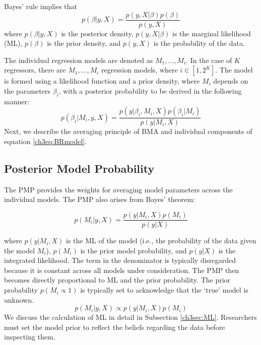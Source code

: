 \begin{refsection}
\begin{subappendices}
    Bayes' rule implies that
    \begin{equation}\label{ch3eq:BRmodel}
    p(\beta \vert y,X) = \frac{p(y,X\vert \beta)p(\beta)}{p(y,X)}
    \end{equation}
    where $p(\beta \vert y, X)$ is the posterior density, $p(y, X\vert \beta)$ is the marginal likelihood (ML), $p(\beta)$ is the prior density, and $p(y,X)$ is the probability of the data. 
    
    The individual regression models are denoted as $M_{1},...,M_{i}$. In the case of $K$ regressors, there are $M_{1},...,M_{i}$ regression models, where $i \in [1,2^{K}]$. The model is formed using a likelihood function and a prior density, where $M_{i}$ depends on the parameters $\beta_{i}$, with a posterior probability to be derived in the following manner:
    \begin{equation}\label{ch3eq:BROM}
    p(\beta_{i} \vert M_{i},y,X) = \frac{p(y\vert \beta_{i},M_{i},X)p(\beta_{i}\vert M_{i})}{p(y \vert M_{i},X)}
    \end{equation}
    Next, we describe the averaging principle of \ac{BMA} and individual components of equation \ref{ch3eq:BRmodel}.
    \subsection*{Posterior Model Probability}
    The \ac{PMP} provides the weights for averaging model parameters across the individual models. The \ac{PMP} also arises from Bayes' theorem:
    
    \begin{equation}\label{ch3eq:PMPmain}
    p(M_{i} \vert y,X) = \frac{p(y\vert M_{i},X)p(M_{i})}{p(y \vert X)}
    \end{equation}
    
    where $p(y\vert M_{i},X)$ is the \ac{ML} of the model (i.e., the probability of the data given the model $M_{i}$), $p(M_{i})$ is the prior model probability, and $p(y\vert X)$ is the integrated likelihood. The term in the denominator is typically disregarded because it is constant across all models under consideration. The \ac{PMP} then becomes directly proportional to ML and the prior probability. The prior probability $p(M_{i} \propto 1)$ is typically set to acknowledge that the `true' model is unknown.
    \begin{equation}
    p(M_{i}\vert y,X) \propto p(y\vert M_{i},X)p(M_{i})
    \end{equation}
    We discuss the calculation of ML in detail in Subsection \ref{ch3sec:ML}. Researchers must set the model prior to reflect the beliefs regarding the data before inspecting them. 

\end{subappendices}
\end{refsection}
